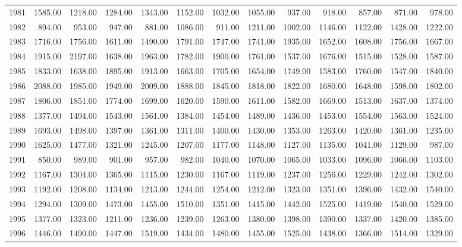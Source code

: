 \begin{longtable}{rrrrrrrrrrrrr}
  1981 & 1585.00 & 1218.00 & 1284.00 & 1343.00 & 1152.00 & 1032.00 & 1055.00 & 937.00 & 918.00 & 857.00 & 871.00 & 978.00 \\ 
  1982 & 894.00 & 953.00 & 947.00 & 881.00 & 1086.00 & 911.00 & 1211.00 & 1002.00 & 1146.00 & 1122.00 & 1428.00 & 1222.00 \\ 
  1983 & 1716.00 & 1756.00 & 1611.00 & 1490.00 & 1791.00 & 1747.00 & 1741.00 & 1935.00 & 1652.00 & 1608.00 & 1756.00 & 1667.00 \\ 
  1984 & 1915.00 & 2197.00 & 1638.00 & 1963.00 & 1782.00 & 1900.00 & 1761.00 & 1537.00 & 1676.00 & 1515.00 & 1528.00 & 1587.00 \\ 
  1985 & 1833.00 & 1638.00 & 1895.00 & 1913.00 & 1663.00 & 1705.00 & 1654.00 & 1749.00 & 1583.00 & 1760.00 & 1547.00 & 1840.00 \\ 
  1986 & 2088.00 & 1985.00 & 1949.00 & 2009.00 & 1888.00 & 1845.00 & 1818.00 & 1822.00 & 1680.00 & 1648.00 & 1598.00 & 1802.00 \\ 
  1987 & 1806.00 & 1851.00 & 1774.00 & 1699.00 & 1620.00 & 1590.00 & 1611.00 & 1582.00 & 1669.00 & 1513.00 & 1637.00 & 1374.00 \\ 
  1988 & 1377.00 & 1494.00 & 1543.00 & 1561.00 & 1384.00 & 1454.00 & 1489.00 & 1436.00 & 1453.00 & 1554.00 & 1563.00 & 1524.00 \\ 
  1989 & 1693.00 & 1498.00 & 1397.00 & 1361.00 & 1311.00 & 1400.00 & 1430.00 & 1353.00 & 1263.00 & 1420.00 & 1361.00 & 1235.00 \\ 
  1990 & 1625.00 & 1477.00 & 1321.00 & 1245.00 & 1207.00 & 1177.00 & 1148.00 & 1127.00 & 1135.00 & 1041.00 & 1129.00 & 987.00 \\ 
  1991 & 850.00 & 989.00 & 901.00 & 957.00 & 982.00 & 1040.00 & 1070.00 & 1065.00 & 1033.00 & 1096.00 & 1066.00 & 1103.00 \\ 
  1992 & 1167.00 & 1304.00 & 1365.00 & 1115.00 & 1230.00 & 1167.00 & 1119.00 & 1237.00 & 1256.00 & 1229.00 & 1242.00 & 1302.00 \\ 
  1993 & 1192.00 & 1208.00 & 1134.00 & 1213.00 & 1244.00 & 1254.00 & 1212.00 & 1323.00 & 1351.00 & 1396.00 & 1432.00 & 1540.00 \\ 
  1994 & 1294.00 & 1309.00 & 1473.00 & 1455.00 & 1510.00 & 1351.00 & 1415.00 & 1442.00 & 1525.00 & 1419.00 & 1540.00 & 1529.00 \\ 
  1995 & 1377.00 & 1323.00 & 1211.00 & 1236.00 & 1239.00 & 1263.00 & 1380.00 & 1398.00 & 1390.00 & 1337.00 & 1420.00 & 1385.00 \\ 
  1996 & 1446.00 & 1490.00 & 1447.00 & 1519.00 & 1434.00 & 1480.00 & 1455.00 & 1525.00 & 1438.00 & 1366.00 & 1514.00 & 1329.00 \\ 

\end{longtable}
